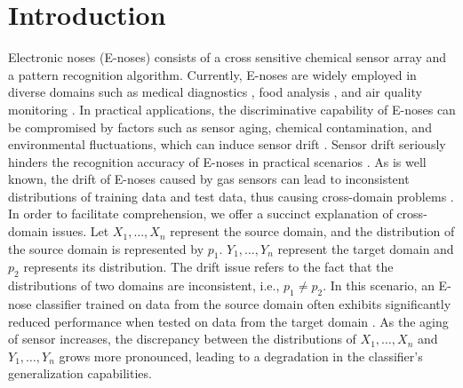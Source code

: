\documentclass[a4paper]{cas-sc}
\begin{document}
\section{Introduction}
Electronic noses (E-noses) consists of a cross sensitive chemical sensor array and a pattern recognition algorithm.
Currently, E-noses are widely employed in diverse domains such as medical diagnostics \citep{DRAGONIERI2009166, DRAGONIERI2007856}, food analysis \citep{DINATALE1997521, PARDO2000397}, and air quality monitoring \citep{DUTTA2003228, JIANG2019108605}. In practical applications, the discriminative capability of E-noses can be compromised by factors such as sensor aging, chemical contamination, and environmental fluctuations, which can induce sensor drift \citep{HOSSEINBABAEI2010641, ZHANG201371, GUNEY201583}. Sensor drift seriously hinders the recognition accuracy of E-noses in practical scenarios \cite{6183455}. As is well known, the drift of E-noses caused by gas sensors can lead to inconsistent distributions of training data and test data, thus causing cross-domain problems \cite{6963383}.
In order to facilitate comprehension, we offer a succinct explanation of cross-domain issues. 
Let ${{X}_{1}},\ldots ,{{X}_{n}}$ represent the source domain, and the distribution of the source domain is represented by ${{p}_{1}}$.
${{Y}_{1}},\ldots ,{{Y}_{n}}$ represent the target domain and ${{p}_{2}}$ represents its distribution. 
The drift issue refers to the fact that the distributions of two domains are inconsistent, i.e., ${{p}_{1}} \ne {{p}_{2}}$. In this scenario, an E-nose classifier trained on data from the source domain often exhibits significantly reduced performance when tested on data from the target domain \cite{di2012drift}.
As the aging of sensor increases, the discrepancy between the distributions of ${{X}_{1}},\ldots,{{X}_{n}}$ and ${{Y}_{1}},\ldots,{{Y}_{n}}$ grows more pronounced, leading to a degradation in the classifier's generalization capabilities.
\end{document}
